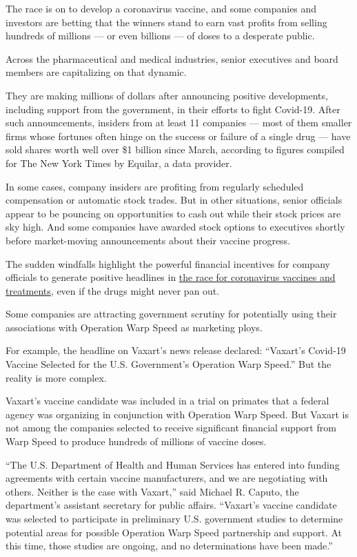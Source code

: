 The race is on to develop a coronavirus vaccine, and some companies and
investors are betting that the winners stand to earn vast profits from
selling hundreds of millions --- or even billions --- of doses to a
desperate public.

Across the pharmaceutical and medical industries, senior executives and
board members are capitalizing on that dynamic.

They are making millions of dollars after announcing positive
developments, including support from the government, in their efforts to
fight Covid-19. After such announcements, insiders from at least 11
companies --- most of them smaller firms whose fortunes often hinge on
the success or failure of a single drug --- have sold shares worth well
over \$1 billion since March, according to figures compiled for The New
York Times by Equilar, a data provider.

In some cases, company insiders are profiting from regularly scheduled
compensation or automatic stock trades. But in other situations, senior
officials appear to be pouncing on opportunities to cash out while their
stock prices are sky high. And some companies have awarded stock options
to executives shortly before market-moving announcements about their
vaccine progress.

The sudden windfalls highlight the powerful financial incentives for
company officials to generate positive headlines in
\href{https://www.nytimes.com/interactive/2020/science/coronavirus-vaccine-tracker.html}{the
race for coronavirus vaccines and treatments}, even if the drugs might
never pan out.

Some companies are attracting government scrutiny for potentially using
their associations with Operation Warp Speed as marketing ploys.

For example, the headline on Vaxart's news release declared: ``Vaxart's
Covid-19 Vaccine Selected for the U.S. Government's Operation Warp
Speed.'' But the reality is more complex.

Vaxart's vaccine candidate was included in a trial on primates that a
federal agency was organizing in conjunction with Operation Warp Speed.
But Vaxart is not among the companies selected to receive significant
financial support from Warp Speed to produce hundreds of millions of
vaccine doses.

``The U.S. Department of Health and Human Services has entered into
funding agreements with certain vaccine manufacturers, and we are
negotiating with others. Neither is the case with Vaxart,'' said Michael
R. Caputo, the department's assistant secretary for public affairs.
``Vaxart's vaccine candidate was selected to participate in preliminary
U.S. government studies to determine potential areas for possible
Operation Warp Speed partnership and support. At this time, those
studies are ongoing, and no determinations have been made.''

